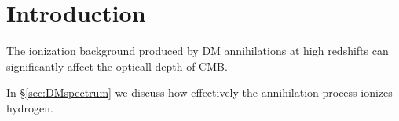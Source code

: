 \section{Introduction}

The ionization background produced by DM annihilations at high redshifts can significantly affect the opticall depth of CMB.

In \S\ref{sec:DMspectrum} we discuss how effectively the annihilation process ionizes hydrogen.


